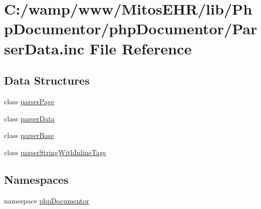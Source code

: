 \hypertarget{_parser_data_8inc}{\section{\-C\-:/wamp/www/\-Mitos\-E\-H\-R/lib/\-Php\-Documentor/php\-Documentor/\-Parser\-Data.inc \-File \-Reference}
\label{_parser_data_8inc}
}
\subsection*{\-Data \-Structures}
\begin{DoxyCompactItemize}
\item 
class \hyperlink{classparser_page}{parser\-Page}
\item 
class \hyperlink{classparser_data}{parser\-Data}
\item 
class \hyperlink{classparser_base}{parser\-Base}
\item 
class \hyperlink{classparser_string_with_inline_tags}{parser\-String\-With\-Inline\-Tags}
\end{DoxyCompactItemize}
\subsection*{\-Namespaces}
\begin{DoxyCompactItemize}
\item 
namespace \hyperlink{namespacephp_documentor}{php\-Documentor}
\end{DoxyCompactItemize}
